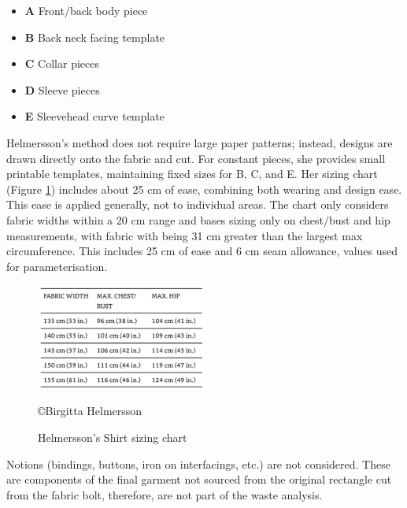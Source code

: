 \begin{itemize}
    \item \textbf{A} Front/back body piece
    \item \textbf{B} Back neck facing template
    \item \textbf{C} Collar pieces
    \item \textbf{D} Sleeve pieces
    \item \textbf{E} Sleevehead curve template
\end{itemize}
Helmersson's method does not require large paper patterns; instead, designs are drawn directly onto the fabric and cut. For constant pieces, she provides small printable templates, maintaining fixed sizes for B, C, and E. Her sizing chart (Figure \ref{fig:bh size chart}) includes about 25 cm of ease, combining both wearing and design ease. This ease is applied generally, not to individual areas. The chart only considers fabric widths within a 20 cm range and bases sizing only on chest/bust and hip measurements, with fabric with being 31 cm greater than the largest max circumference. This includes 25 cm of ease and 6 cm seam allowance, values used for parameterisation.
\begin{figure} [H]
    \centering
    \includegraphics[width = 0.5\textwidth]{Images/BH size chart.png} 
    \caption{Helmersson's Shirt sizing chart}
    \copyright {Birgitta Helmersson}
    \label{fig:bh size chart}
\end{figure}
Notions (bindings, buttons, iron on interfacings, etc.) are not considered. These are components of the final garment not sourced from the original rectangle cut from the fabric bolt, therefore, are not part of the waste analysis.


